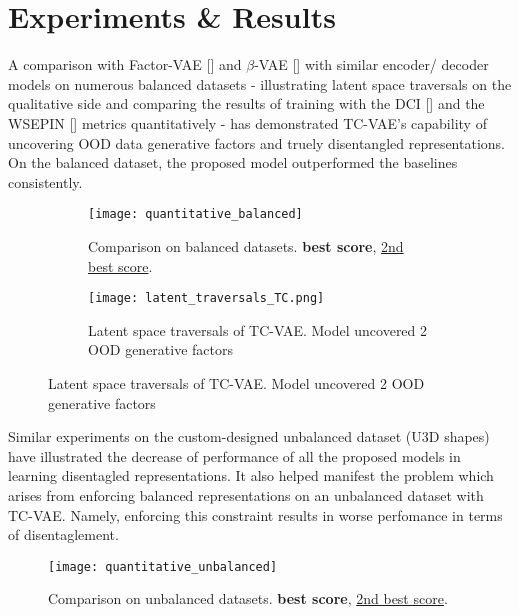 \documentclass[twoside,11pt]{article}
\begin{document}
\section{Experiments \& Results}
A comparison with Factor-VAE [\cite{FactorVAE}] and $\beta$-VAE [\cite{betaVAE}] with similar encoder/ decoder models on numerous balanced datasets - illustrating latent space traversals on the qualitative side and comparing the results of training with the DCI [\cite{DCI}] and the WSEPIN [\cite{WSEPIN}] metrics quantitatively - has demonstrated TC-VAE's capability of uncovering OOD data generative factors and truely disentangled representations. On the balanced dataset, the proposed model outperformed the baselines consistently.

\newpage

\begin{figure}[h]
  \captionsetup{justification=centering}
  \caption{Results on balanced datasets.}
  \captionsetup[subfigure]{justification=centering}
  \hfill
  \begin{subfigure}{0.49\textwidth}
    \texttt{[image: quantitative\_balanced]}
    \captionsetup{justification=centering}
    \caption{Comparison on balanced datasets. \textbf{best score}, \underline{2nd best score}.}
  \end{subfigure}
  \hfill
  \begin{subfigure}{0.49\textwidth}
    \texttt{[image: latent\_traversals\_TC.png]}
    \caption{Latent space traversals of TC-VAE. Model uncovered 2 OOD generative factors}
    \centering
  \end{subfigure}
  \hfill
\end{figure}

Similar experiments on the custom-designed unbalanced dataset (U3D shapes) have illustrated the decrease of performance of all the proposed models in learning disentagled representations. It also helped manifest the problem which arises from enforcing balanced representations on an unbalanced dataset with TC-VAE. Namely, enforcing this constraint results in worse perfomance in terms of disentaglement.

\begin{figure}[h]
  \texttt{[image: quantitative\_unbalanced]}
  \centering
  \captionsetup{justification=centering}
  \caption{Comparison on unbalanced datasets. \textbf{best score}, \underline{2nd best score}.}
\end{figure}

\newpage
\end{document}
